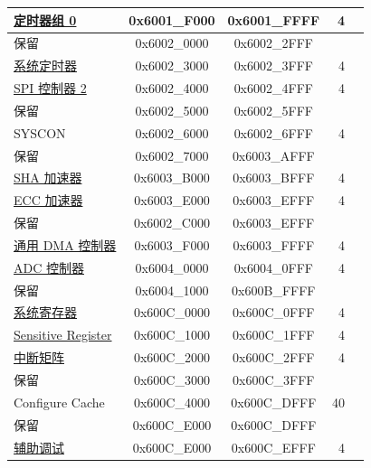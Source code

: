 \begin{longtable}[c]{ |p{5cm}|c|c|r|p{1.0cm}| }
                        \hyperref[mod:timg]{定时器组 0}              & 0x6001\_F000 & 0x6001\_FFFF &   4    &   \\\hline
    \rowcolor{gray!25}  保留                    & 0x6002\_0000 & 0x6002\_2FFF &        &   \\\hline
                        \hyperref[mod:systimer]{系统定时器}              & 0x6002\_3000 & 0x6002\_3FFF &   4    &   \\\hline
                        \hyperref[mod:spi]{SPI 控制器 2}            & 0x6002\_4000 & 0x6002\_4FFF &   4    &   \\\hline
    \rowcolor{gray!25}  保留                    & 0x6002\_5000 & 0x6002\_5FFF &        &   \\\hline
                        SYSCON              & 0x6002\_6000 & 0x6002\_6FFF &   4    &   \\\hline
    \rowcolor{gray!25}  保留                    & 0x6002\_7000 & 0x6003\_AFFF &        &   \\\hline
                        \hyperref[mod:sha]{SHA 加速器}              & 0x6003\_B000 & 0x6003\_BFFF &   4    &   \\\hline
                        \hyperref[mod:ecc]{ECC 加速器}              & 0x6003\_E000 & 0x6003\_EFFF &   4    &   \\\hline
    \rowcolor{gray!25}  保留                    & 0x6002\_C000 & 0x6003\_EFFF &        &   \\\hline
                        \hyperref[mod:dma]{通用 DMA 控制器}         & 0x6003\_F000 & 0x6003\_FFFF &   4    &   \\\hline

                        \hyperref[mod:sensor]{ADC 控制器}              & 0x6004\_0000 & 0x6004\_0FFF &   4    &   \\\hline
    \rowcolor{gray!25}  保留                    & 0x6004\_1000 & 0x600B\_FFFF &        &   \\\hline
                        \hyperref[mod:sysreg]{系统寄存器}              & 0x600C\_0000 & 0x600C\_0FFF &   4    &   \\\hline
                        \href{https://github.com/espressif/esp-idf/blob/master/components/soc/esp32c2/register/soc/sensitive_reg.h}{Sensitive Register}      & 0x600C\_1000 & 0x600C\_1FFF &   4    &   \\\hline
                        \hyperref[mod:intmtrx]{中断矩阵}                & 0x600C\_2000 & 0x600C\_2FFF &   4    &   \\\hline
    \rowcolor{gray!25}  保留                    & 0x600C\_3000 & 0x600C\_3FFF &        &   \\\hline
                        Configure Cache         & 0x600C\_4000 & 0x600C\_DFFF &  40    &   \\\hline
    \rowcolor{gray!25}  保留                    & 0x600C\_E000 & 0x600C\_DFFF &        &   \\\hline
                        \hyperref[mod:dbgassist]{辅助调试}                & 0x600C\_E000 & 0x600C\_EFFF &   4    &   \\\hline

\end{longtable}
